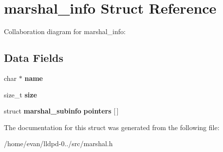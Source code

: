 \section{marshal\-\_\-info \-Struct \-Reference}
\label{structmarshal__info}


\-Collaboration diagram for marshal\-\_\-info\-:
\subsection*{\-Data \-Fields}
\begin{DoxyCompactItemize}
\item 
char $\ast$ {\bfseries name}\label{structmarshal__info_a5ac083a645d964373f022d03df4849c8}

\item 
size\-\_\-t {\bfseries size}\label{structmarshal__info_a854352f53b148adc24983a58a1866d66}

\item 
struct {\bf marshal\-\_\-subinfo} {\bfseries pointers} [$\,$]\label{structmarshal__info_a3ffa37a908282be38aff789534d88ce8}

\end{DoxyCompactItemize}


\-The documentation for this struct was generated from the following file\-:\begin{DoxyCompactItemize}
\item 
/home/evan/lldpd-\/0../src/marshal.\-h\end{DoxyCompactItemize}
